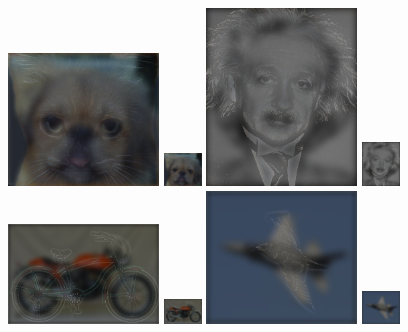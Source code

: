 \begin{figure}[h]
	    		\centering
	    		\includegraphics[width=4cm]{cat&dog.jpg}
		   	\includegraphics[width=1cm]{cat&dog.jpg}
			\includegraphics[width=4cm]{einstein&marilyn.jpg}
	    		\includegraphics[width=1cm]{einstein&marilyn.jpg}
	    		\includegraphics[width=4cm]{bicycle&motorcycle.jpg}
	    		\includegraphics[width=1cm]{bicycle&motorcycle.jpg}
    			\includegraphics[width=4cm]{bird&plane.jpg}
	    		\includegraphics[width=1cm]{bird&plane.jpg}

\end{figure}
